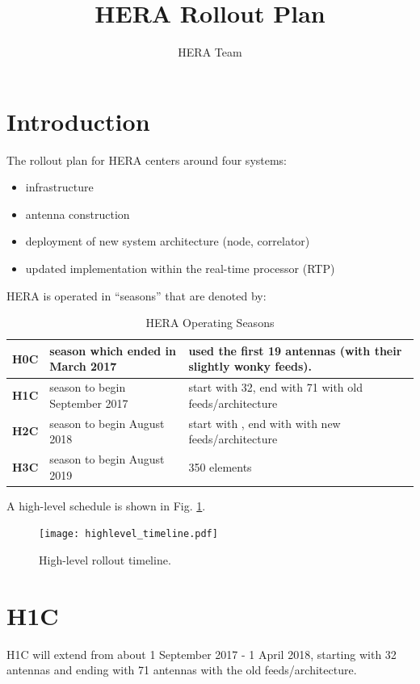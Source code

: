 \documentclass{article}
\begin{document}
\author{HERA Team}
\title{HERA Rollout Plan}
\maketitle

\setcounter{section}{-1}
\section{Introduction}
The rollout plan for HERA centers around four systems:
\begin{itemize}
\item infrastructure
\item antenna construction
\item deployment of new system architecture (node, correlator)
\item updated implementation within the real-time processor (RTP)
\end{itemize}

HERA is operated in ``seasons'' that are denoted by:

\begin{table}[H]
\caption{HERA Operating Seasons}
\begin{tabular}{p{0.5in} p{2.2in} p{3.5in}} \hline
{\bf H0C} & season which ended in March 2017 & used the first 19 antennas (with their slightly wonky feeds). \\ \hline
{\bf H1C} & season to begin September 2017 & start with 32, end with 71 with old feeds/architecture\\ \hline
{\bf H2C} & season to begin August 2018 & start with , end with with new feeds/architecture\\ \hline
{\bf H3C} & season to begin August 2019 & 350 elements \\ \hline
\end{tabular}
\end{table}

A high-level schedule is shown in Fig. \ref{Fig:rollout}.

\begin{figure}
\texttt{[image: highlevel\_timeline.pdf]} %
\caption{High-level rollout timeline.}
\label{Fig:rollout}
\end{figure}

\section{H1C}
H1C will extend from about 1 September 2017 - 1 April 2018, starting with 32 antennas and ending with 71 antennas with the old feeds/architecture.
\end{document}
